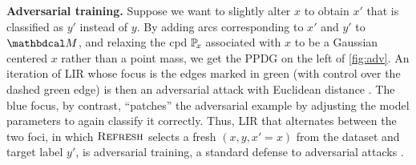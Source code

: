\textbf{Adversarial training.}
Suppose we want to slightly alter $x$ to obtain $x'$ that is classified as $y'$ instead of $y$.
By adding arcs corresponding to $x'$ and $y'$ to $\dg M$,
    and relaxing the cpd $\p_x$ associated with $x$ to be a Gaussian centered $x$ rather than a point mass,
    we get the PPDG on the left of \cref{fig:adv}.
%
An iteration of LIR
whose focus is the edges marked in green (with control over the dashed green edge)
is then an adversarial attack with Euclidean distance \cite{biggio2013advattk}.
The blue focus, by contrast, ``patches'' the adversarial example by
    adjusting the model parameters to again classify it correctly.
Thus, LIR
that alternates between the two foci,
in which $\textsc{Refresh}$ selects a fresh $(x,y,x'=x)$ from the dataset
    and target label $y'$,
is
adversarial training, a standard defense to adversarial attacks \cite{goodfellow2014explaining}.
%

